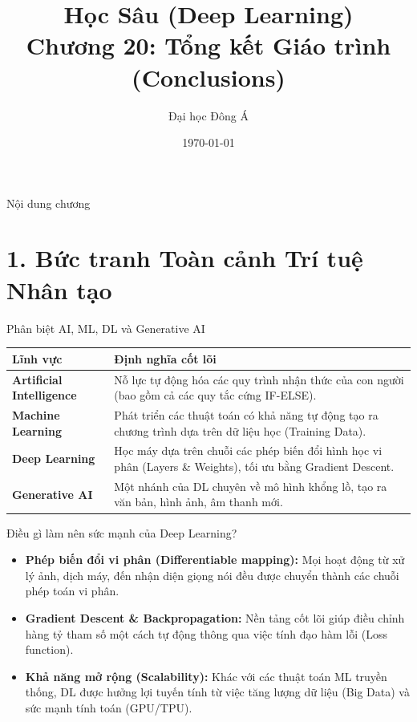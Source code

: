 \documentclass[aspectratio=169]{beamer}
\title[Chương 20: Conclusions]{Học Sâu (Deep Learning) \\ \vspace{0.5cm} \Large Chương 20: Tổng kết Giáo trình (Conclusions)}
\author{Đại học Đông Á}
\date{\today}
\begin{document}
\begin{frame}
    \titlepage
\end{frame}

\begin{frame}{Nội dung chương}
    \tableofcontents
\end{frame}

\section{1. Bức tranh Toàn cảnh Trí tuệ Nhân tạo}

\begin{frame}{Phân biệt AI, ML, DL và Generative AI}
    \begin{table}[]
        \centering
        \begin{tabular}{@{}lp{10cm}@{}}
        \toprule
        \textbf{Lĩnh vực} & \textbf{Định nghĩa cốt lõi} \\ \midrule
        \textbf{Artificial Intelligence} & Nỗ lực tự động hóa các quy trình nhận thức của con người (bao gồm cả các quy tắc cứng IF-ELSE). \\ \addlinespace
        \textbf{Machine Learning} & Phát triển các thuật toán có khả năng tự động tạo ra chương trình dựa trên dữ liệu học (Training Data). \\ \addlinespace
        \textbf{Deep Learning} & Học máy dựa trên chuỗi các phép biến đổi hình học vi phân (Layers \& Weights), tối ưu bằng Gradient Descent. \\ \addlinespace
        \textbf{Generative AI} & Một nhánh của DL chuyên về mô hình khổng lồ, tạo ra văn bản, hình ảnh, âm thanh mới. \\ \bottomrule
        \end{tabular}
    \end{table}
\end{frame}

\begin{frame}{Điều gì làm nên sức mạnh của Deep Learning?}
    \begin{itemize}
        \item \textbf{Phép biến đổi vi phân (Differentiable mapping):} Mọi hoạt động từ xử lý ảnh, dịch máy, đến nhận diện giọng nói đều được chuyển thành các chuỗi phép toán vi phân.
        \item \textbf{Gradient Descent \& Backpropagation:} Nền tảng cốt lõi giúp điều chỉnh hàng tỷ tham số một cách tự động thông qua việc tính đạo hàm lỗi (Loss function).
        \item \textbf{Khả năng mở rộng (Scalability):} Khác với các thuật toán ML truyền thống, DL được hưởng lợi tuyến tính từ việc tăng lượng dữ liệu (Big Data) và sức mạnh tính toán (GPU/TPU).
    \end{itemize}
\end{frame}
\end{document}
